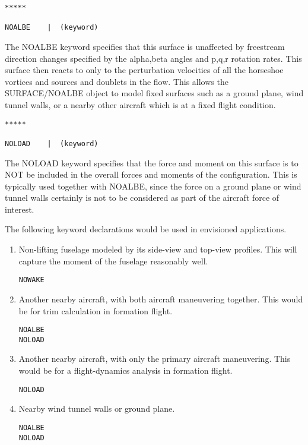 \begin{lstlisting}
*****

NOALBE    |  (keyword)

\end{lstlisting}

The NOALBE keyword specifies that this surface is unaffected by
freestream direction changes specified by the alpha,beta angles
and p,q,r rotation rates.  This surface then reacts to only to
the perturbation velocities of all the horseshoe vortices and 
sources and doublets in the flow.
This allows the SURFACE/NOALBE object to model fixed surfaces such 
as a ground plane, wind tunnel walls, or a nearby other aircraft 
which is at a fixed flight condition.\\

\begin{lstlisting}
*****

NOLOAD    |  (keyword)

\end{lstlisting}

The NOLOAD keyword specifies that the force and moment on this surface
is to NOT be included in the overall forces and moments of the configuration.
This is typically used together with NOALBE, since the force on a ground
plane or wind tunnel walls certainly is not to be considered as part
of the aircraft force of interest.


The following keyword declarations would be used in envisioned applications.
\begin{enumerate}
\item Non-lifting fuselage modeled by its side-view and top-view profiles.
This will capture the moment of the fuselage reasonably well.
\begin{lstlisting}
NOWAKE
\end{lstlisting}

\item Another nearby aircraft, with both aircraft maneuvering together.
This would be for trim calculation in formation flight.
\begin{lstlisting}
NOALBE
NOLOAD
\end{lstlisting}

\item Another nearby aircraft, with only the primary aircraft maneuvering.
This would be for a flight-dynamics analysis in formation flight.
\begin{lstlisting}
NOLOAD
\end{lstlisting}

\item Nearby wind tunnel walls or ground plane.
\begin{lstlisting}
NOALBE
NOLOAD
\end{lstlisting}
\end{enumerate}

